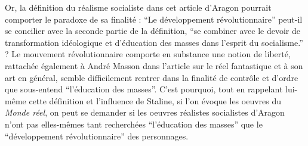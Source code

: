 Or, la définition du réalisme socialiste dans cet article d’Aragon pourrait comporter le paradoxe de sa finalité : \enquote{Le développement révolutionnaire} peut-il se concilier avec la seconde partie de la définition, \enquote{se combiner avec le devoir de transformation idéologique et d’éducation des masses dans l’esprit du socialisme.} ? Le mouvement révolutionnaire comporte en substance une notion de liberté, rattachée également à André Masson dans l’article sur le réel fantastique et à son art en général, semble difficilement rentrer dans la finalité de contrôle et d’ordre que sous-entend \enquote{l’éducation des masses}. C’est pourquoi, tout en rappelant lui-même cette définition et l’influence de Staline, si l’on évoque les oeuvres du \emph{Monde réel}, on peut se demander si les oeuvres réalistes socialistes d’Aragon n’ont pas elles-mêmes tant recherchées \enquote{l’éducation des masses} que le \enquote{développement révolutionnaire} des personnages. 

